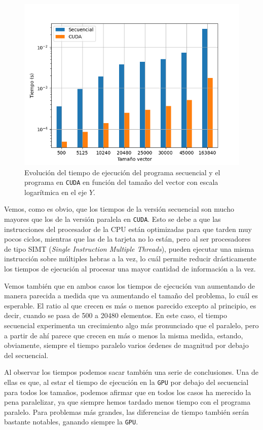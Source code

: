 \documentclass[11pt,a4paper]{article}
\begin{document}
\begin{figure}[H]
  \centering
  \includegraphics[scale=0.6]{img/seq-cuda}
  \caption{Evolución del tiempo de ejecución del programa secuencial y el programa en
  \texttt{CUDA} en función del tamaño del vector con escala logarítmica en el eje $Y$.}
  \label{fig:seq-cuda}
\end{figure}

Vemos, como es obvio, que los tiempos de la versión secuencial son mucho mayores que los
de la versión paralela en \texttt{CUDA}. Esto se debe a que las instrucciones del procesador
de la CPU están optimizadas para que tarden muy pocos ciclos, mientras que las de la
tarjeta no lo están, pero al ser procesadores de tipo SIMT
(\textit{Single Instruction Multiple Threads}), pueden ejecutar una misma
instrucción sobre múltiples hebras a la vez, lo cuál permite reducir drásticamente los tiempos
de ejecución al procesar una mayor cantidad de información a la vez.

Vemos también que en ambos casos los tiempos de ejecución van aumentando de manera parecida
a medida que va aumentando el tamaño del problema, lo cuál es esperable. El ratio al que crecen
es más o menos parecido excepto al principio, es decir, cuando se pasa de 500 a 20480 elementos.
En este caso, el tiempo secuencial experimenta un crecimiento algo más pronunciado que el
paralelo, pero a partir de ahí parece que crecen en más o menos la misma medida, estando,
obviamente, siempre el tiempo paralelo varios órdenes de magnitud por debajo del secuencial.

Al observar los tiempos podemos sacar también una serie de conclusiones. Una de ellas es que, al
estar el tiempo de ejecución en la \texttt{GPU} por debajo del secuencial para todos los tamaños,
podemos afirmar que en todos los casos ha merecido la pena paralelizar, ya que siempre
hemos tardado menos tiempo con el programa paralelo. Para problemas más grandes, las diferencias
de tiempo también serán bastante notables, ganando siempre la \texttt{GPU}.
\end{document}
